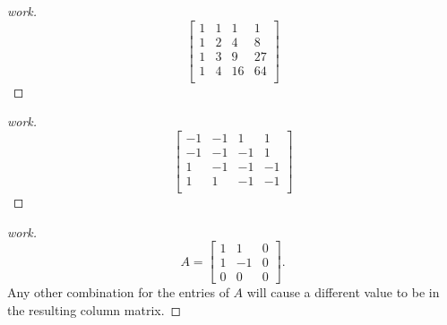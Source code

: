 \documentclass{article}
\begin{document}
\begin{enumerate}
{\begin{enumerate}
\begin{proof}[work]
      \[
        \begin{bmatrix}
          1 & 1 & 1  & 1  \\
          1 & 2 & 4  & 8  \\
          1 & 3 & 9  & 27 \\
          1 & 4 & 16 & 64 \\
        \end{bmatrix}
      \]
    \end{proof}
    \begin{proof}[work]
      \[
        \begin{bmatrix}
          -1 & -1 & 1  & 1  \\
          -1 & -1 & -1 & 1  \\
          1  & -1 & -1 & -1 \\
          1  & 1  & -1 & -1 \\
        \end{bmatrix}
      \]
    \end{proof}
  \end{enumerate}}
  \begin{proof}[work]
    \[
      A = \begin{bmatrix}
        1 & 1  & 0 \\
        1 & -1 & 0 \\
        0 & 0  & 0
      \end{bmatrix}.
    \]
    Any other combination for the entries of $A$ will cause a different value to be in the resulting column matrix.
  \end{proof}
\end{enumerate}
\end{document}
